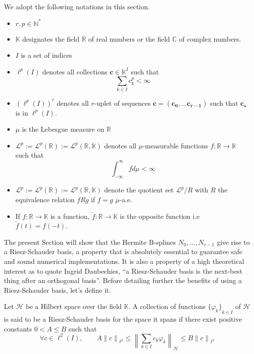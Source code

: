 We adopt the following notations in this section.
\begin{itemize}
  \item $r, p \in \mathbb{N}^*$
  \item $\mathbb{K}$ designates the field $\mathbb{R}$ of real numbers or the field $\mathbb{C}$ of complex numbers.
  \item $I$ is a set of indices
  \item $\ell^p(I)$ denotes all collections $\bm{c} \in \mathbb{K}^{I}$ such that \begin{equation*}
      \sum_{k \in I} c_k^p < \infty
    \end{equation*}
  \item ${\left(\ell^p(I)\right)}^r$ denotes all $r$-uplet of sequences $\bm{c}=\left(\bm{c_{0}},\ldots 
    \bm{c_{r-1}}\right)$ such that $\bm{c_{s}}$ is in $\ell^{p}(I)$.
  \item $\mu$ is the Lebesgue measure on $\mathbb{R}$
  \item $\mathscr{L}^p := \mathscr{L}^p(\mathbb{R}) := \mathscr{L}^p(\mathbb{R}, \mathbb{K})$ denotes all 
    $\mu$-measurable functions $f: \mathbb{R} \to \mathbb{K}$ such that \begin{equation*}
      \int_{-\infty}^{\infty} f d\mu < \infty
    \end{equation*}
  \item $\mathcal{L}^p := \mathcal{L}^p(\mathbb{R}) := \mathcal{L}^p(\mathbb{R}, \mathbb{K})$ denote the quotient set 
    $\mathscr{L}^p/R$ with $R$ the equivalence relation $f R g$ if $f = g$ $\mu$-a.e.
  \item If $f: \mathbb{R} \to \mathbb{K}$ is a function, $\check{f}: \mathbb{R} \to \mathbb{K}$ is the opposite function 
    i.e $\check{f}(t) = f(-t)$.
\end{itemize} 

The present Section will show that the Hermite B-splines $N_0, \ldots, N_{r-1}$ give rise to a Riesz-Schauder basis, a 
property that is absolutely essential to guarantee safe and sound numerical implementations. It is also a property of a 
high theoretical interest as to quote Ingrid Daubechies, ``a Riesz-Schauder basis is the next-best thing after an 
orthogonal basis''. Before detailing further the benefits of using a Riesz-Schauder basis, let's define it.  
\begin{deftn}
  Let $\mathcal{H}$ be a Hilbert space over the field $\mathbb{K}$.  A collection of functions ${\{\varphi_k\}}_{k \in 
  I}$ of $\mathcal{H}$ is said to be a Riesz-Schauder basis for the space it spans if there exist positive constants $0 
  < A \leq B$ such that
  \begin{equation}\label{eq:def-Riesz}
    \forall c \in \ell^2(I), \qquad A {\|c\|}_{\ell^2} \leq {\left\| \sum_{k \in I} c_k \varphi_k 
    \right\|}_{\mathcal{H}} \leq B {\|c\|}_{\ell^2}
  \end{equation}
\end{deftn} 


